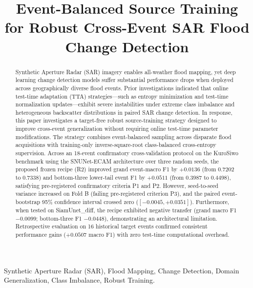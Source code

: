 \documentclass[conference]{IEEEtran}
\begin{document}
\title{Event-Balanced Source Training for Robust Cross-Event SAR Flood Change Detection}

\author{
}

\maketitle

\begin{abstract}
Synthetic Aperture Radar (SAR) imagery enables all-weather flood mapping, yet deep learning change detection models suffer substantial performance drops when deployed across geographically diverse flood events. Prior investigations indicated that online test-time adaptation (TTA) strategies—such as entropy minimization and test-time normalization updates—exhibit severe instabilities under extreme class imbalance and heterogeneous backscatter distributions in paired SAR change detection. In response, this paper investigates a target-free robust source-training strategy designed to improve cross-event generalization without requiring online test-time parameter modifications. The strategy combines event-balanced sampling across disparate flood acquisitions with training-only inverse-square-root class-balanced cross-entropy supervision. Across an 18-event confirmatory cross-validation protocol on the KuroSiwo benchmark using the SNUNet-ECAM architecture over three random seeds, the proposed frozen recipe (R2) improved grand event-macro F1 by $+0.0136$ (from $0.7202$ to $0.7338$) and bottom-three lower-tail event F1 by $+0.0511$ (from $0.3987$ to $0.4498$), satisfying pre-registered confirmatory criteria P1 and P2. However, seed-to-seed variance increased on Fold B (failing pre-registered criterion P3), and the paired event-bootstrap 95\% confidence interval crossed zero ($[-0.0045, +0.0351]$). Furthermore, when tested on SiamUnet\_diff, the recipe exhibited negative transfer (grand macro F1 $-0.0099$; bottom-three F1 $-0.0448$), demonstrating an architectural limitation. Retrospective evaluation on 16 historical target events confirmed consistent performance gains ($+0.0507$ macro F1) with zero test-time computational overhead.
\end{abstract}

\begin{IEEEkeywords}
Synthetic Aperture Radar (SAR), Flood Mapping, Change Detection, Domain Generalization, Class Imbalance, Robust Training.
\end{IEEEkeywords}
\end{document}
